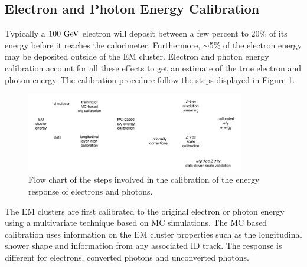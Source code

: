 \subsection{Electron and Photon Energy Calibration}
\label{sec:reco:EMCalibration}

\indent Typically a $100 \gev$ electron will deposit between a few percent to 20\% of its energy before it reaches the calorimeter.\cite{EMReco13TeV}  Furthermore, $\sim$5\% of the electron energy may be deposited outside of the EM cluster.  Electron and photon energy calibration account for all these effects to get an estimate of the true electron and photon energy.  The calibration procedure follow the steps displayed in Figure \ref{fig:EMCalibFlow}. \\

\begin{figure}[h!]
  \begin{center}
    \includegraphics[width=0.85\textwidth]{figures/EMCalib/ElecCalib.png}\hspace{0.05\textwidth}
\end{center}
\caption[Flow chart of the steps involved in the calibration of the energy response of electrons and photons]{Flow chart of the steps involved in the calibration of the energy response of electrons and photons.\cite{EMReco8TeV} }
\label{fig:EMCalibFlow} 
\end{figure}

\indent The EM clusters are first calibrated to the original electron or photon energy using a multivariate technique\cite{TMVA} based on MC simulations.\cite{EMReco13TeV,EMReco8TeV}   The MC based calibration uses information on the EM cluster properties such as the longitudinal shower shape and information from any associated ID track.  The response is different for electrons, converted photons and unconverted photons.  \\

